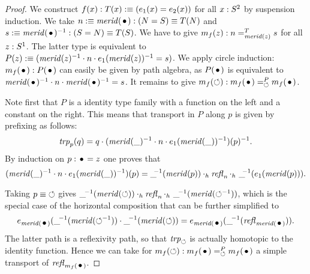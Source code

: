\documentclass[english,a4]{article}
\begin{document}
\begin{proof}
We construct $f(x):T(x)\mathrel{\hbox{:}\mkern-5mu\equiv}(e_1(x)=e_2(x))$ for all $x:S^2$ by 
suspension induction. We take $n\defeq\mrd(\base):(N=S)\jdeq T(N)$ and 
$s\defeq\mrd(\base)^{-1}:(S=N)\jdeq T(S)$. 
We have to give $m_f(z): n=^T_{\mathit{merid}(z)}s$
for all $z:{S^1}$. The latter type is equivalent to
$P(z)\mathrel{\hbox{:}\mkern-5mu\equiv}(\mathit{merid}(z)^{-1}\cdot n\cdot e_1(\mathit{merid}(z))^{-1} = s)$.
We apply circle induction:
$m_f(\base): P(\base)$ can easily be given by path algebra,
as $P(\base)$ is equivalent to 
$\mrd(\base)^{-1}\cdot n\cdot\mrd(\base)^{-1} = s$.
It remains to give $m_f(\Sloop): m_f(\base)=^P_{\Sloop}m_f(\base)$.

Note first that $P$ is a identity type family with a function on the left
and a constant on the right. This means that transport in $P$ along $p$
is given by prefixing as follows:
\[
\mathop{\mathit{trp}^{}_{p}}(q) = q \cdot (\mathit{merid}(\_)^{-1}\cdot n \cdot e_1(\mathit{merid}(\_))^{-1})(p)^{-1}.
\]
By induction on $p:\base=z$ one proves that
\[
(\mathit{merid}(\_)^{-1}\cdot n \cdot e_1(\mathit{merid}(\_))^{-1})(p) = 
\_\!\!^{-1}(\mathit{merid}(p)) \cdot_h \mathop{{\mathit{refl}}_{n}} \cdot_h\  \_\!\!^{-1}(e_1(\mathit{merid}(p))).
\]
\begin{center}
\end{center}

Taking $p\equiv{\mathord{\circlearrowleft}}$ gives
$\_\!^{-1}(\mathit{merid}(\mathord{\circlearrowleft})) \cdot_h \mathop{{\mathit{refl}}_{n}} \cdot_h\  \_\!^{-1}(\mathit{merid}(\mathord{\circlearrowleft}^{-1}))$,
which is the special case of the horizontal composition that can be further
simplified to
\begin{align}
  \label{eq:trp-for-e1=e2}
e_{\mrd(\base)}(\_\!^{-1}(\mrd(\Sloop^{-1})) \cdot\_\!^{-1}(\mrd(\Sloop)) = 
e_{\mrd(\base)}(\_\!^{-1}(\refl{\mrd(\base)})).
\end{align}
The latter path is a reflexivity path, so that $\mathop{\mathit{trp}^{}_{\mathord{\circlearrowleft}}}$ is actually homotopic 
to the identity function. Hence we can take for 
$m_f(\Sloop): m_f(\base)=^P_{\Sloop}m_f(\base)$ a simple transport of $\refl{m_f(\base)}$.


\end{proof}
\end{document}
